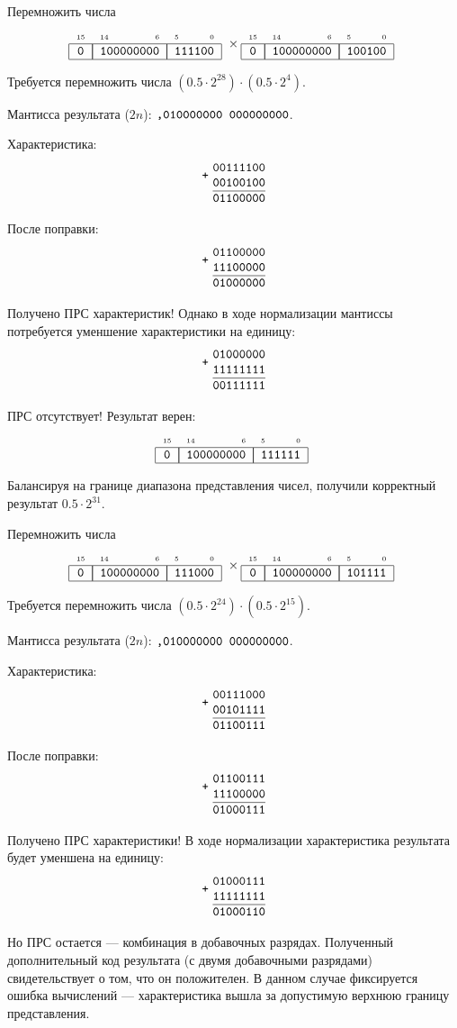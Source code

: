 \begin{Example} 
    Перемножить числа
    \[
        \FloatMyCharHex{0}{100000000}{111100}\times
        \FloatMyCharHex{0}{100000000}{100100}
    \]
\end{Example}
\begin{Solve}
    Требуется перемножить числа $(0.5\cdot 2^{28})\cdot(0.5\cdot 2^{4})$.
    
    Мантисса результата ($2n$): $\texttt{,010000000 000000000}$.
    
    Характеристика:
    \[
        \Addition{00111100}
                 {00100100}
                 {01100000}
    \]
    
    После поправки:
    \[
        \Addition{01100000}
                 {11100000}
                 {01000000}
    \]
    
    Получено ПРС характеристик! Однако в ходе нормализации мантиссы потребуется уменшение характеристики на единицу:
    \[
        \Addition{01000000}
                 {11111111}
                 {00111111}
    \]
    
    ПРС отсутствует! Результат верен:
    \[
        \FloatMyCharHex{0}{100000000}{111111}
    \]
    
    Балансируя на границе диапазона представления чисел, получили корректный результат $0.5\cdot 2^{31}$.
\end{Solve}

\begin{Example} 
    Перемножить числа
    \[
        \FloatMyCharHex{0}{100000000}{111000} \times
        \FloatMyCharHex{0}{100000000}{101111}
    \]
\end{Example}
\begin{Solve}
    Требуется перемножить числа $(0.5\cdot 2^{24})\cdot(0.5\cdot 2^{15})$.
    
    Мантисса результата ($2n$): $\texttt{,010000000 000000000}$.
    
    Характеристика:
    \[
        \Addition{00111000}
                 {00101111}
                 {01100111}
    \]
    
    После поправки:
    \[
        \Addition{01100111}
                 {11100000}
                 {01000111}
    \]
    
    Получено ПРС характеристики! В ходе нормализации характеристика результата будет уменшена на единицу:
    \[
        \Addition{01000111}
                 {11111111}
                 {01000110}
    \]
    
    Но ПРС остается --- комбинация  в добавочных разрядах. Полученный дополнительный код результата (с двумя добавочными разрядами) свидетельствует о том, что он положителен. В данном случае фиксируется ошибка вычислений ---  характеристика вышла за допустимую верхнюю границу представления.
\end{Solve}

